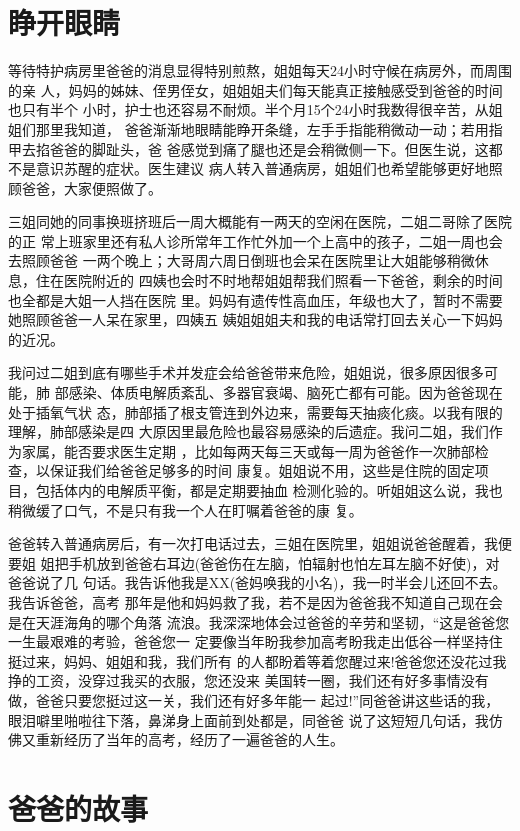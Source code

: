 \documentclass[12pt]{book}
\begin{document}
\section{睁开眼睛}
\label{sec-9-9}

等待特护病房里爸爸的消息显得特别煎熬，姐姐每天24小时守候在病房外，而周围的亲
人，妈妈的姊妹、侄男侄女，姐姐姐夫们每天能真正接触感受到爸爸的时间也只有半个
小时，护士也还容易不耐烦。半个月15个24小时我数得很辛苦，从姐姐们那里我知道，
爸爸渐渐地眼睛能睁开条缝，左手手指能稍微动一动；若用指甲去掐爸爸的脚趾头，爸
爸感觉到痛了腿也还是会稍微侧一下。但医生说，这都不是意识苏醒的症状。医生建议
病人转入普通病房，姐姐们也希望能够更好地照顾爸爸，大家便照做了。

三姐同她的同事换班挤班后一周大概能有一两天的空闲在医院，二姐二哥除了医院的正
常上班家里还有私人诊所常年工作忙外加一个上高中的孩子，二姐一周也会去照顾爸爸
一两个晚上；大哥周六周日倒班也会呆在医院里让大姐能够稍微休息，住在医院附近的
四姨也会时不时地帮姐姐帮我们照看一下爸爸，剩余的时间也全都是大姐一人挡在医院
里。妈妈有遗传性高血压，年级也大了，暂时不需要她照顾爸爸一人呆在家里，四姨五
姨姐姐姐夫和我的电话常打回去关心一下妈妈的近况。

我问过二姐到底有哪些手术并发症会给爸爸带来危险，姐姐说，很多原因很多可能，肺
部感染、体质电解质紊乱、多器官衰竭、脑死亡都有可能。因为爸爸现在处于插氧气状
态，肺部插了根支管连到外边来，需要每天抽痰化痰。以我有限的理解，肺部感染是四
大原因里最危险也最容易感染的后遗症。我问二姐，我们作为家属，能否要求医生定期
，比如每两天每三天或每一周为爸爸作一次肺部检查，以保证我们给爸爸足够多的时间
康复。姐姐说不用，这些是住院的固定项目，包括体内的电解质平衡，都是定期要抽血
检测化验的。听姐姐这么说，我也稍微缓了口气，不是只有我一个人在盯嘱着爸爸的康
复。

爸爸转入普通病房后，有一次打电话过去，三姐在医院里，姐姐说爸爸醒着，我便要姐
姐把手机放到爸爸右耳边(爸爸伤在左脑，怕辐射也怕左耳左脑不好使)，对爸爸说了几
句话。我告诉他我是XX(爸妈唤我的小名)，我一时半会儿还回不去。我告诉爸爸，高考
那年是他和妈妈救了我，若不是因为爸爸我不知道自己现在会是在天涯海角的哪个角落
流浪。我深深地体会过爸爸的辛劳和坚韧，“这是爸爸您一生最艰难的考验，爸爸您一
定要像当年盼我参加高考盼我走出低谷一样坚持住挺过来，妈妈、姐姐和我，我们所有
的人都盼着等着您醒过来!爸爸您还没花过我挣的工资，没穿过我买的衣服，您还没来
美国转一圈，我们还有好多事情没有做，爸爸只要您挺过这一关，我们还有好多年能一
起过!”同爸爸讲这些话的我，眼泪噼里啪啦往下落，鼻涕身上面前到处都是，同爸爸
说了这短短几句话，我仿佛又重新经历了当年的高考，经历了一遍爸爸的人生。
\section{爸爸的故事}
\label{sec-9-10}
\end{document}
